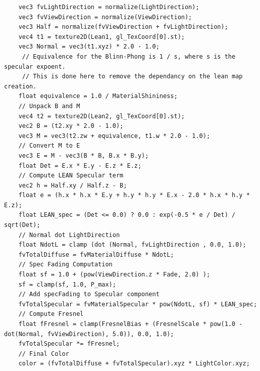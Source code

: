 \documentclass[10pt, conference]{IEEEtran}
\begin{document}
\lstset{basicstyle=\footnotesize,xleftmargin=20pt,numbers=left, breaklines=true, language=C, caption=GLSL pseudo code for specular fading applied in LEAN shader in tangent space., label=GLSLCode}
\begin{lstlisting}
	vec3 fvLightDirection = normalize(LightDirection);
	vec3 fvViewDirection = normalize(ViewDirection);
	vec3 Half = normalize(fvViewDirection + fvLightDirection);
	vec4 t1 = texture2D(Lean1, gl_TexCoord[0].st);
	vec3 Normal = vec3(t1.xyz) * 2.0 - 1.0;
	 // Equivalence for the Blinn-Phong is 1 / s, where s is the specular expoent.
	 // This is done here to remove the dependancy on the lean map creation.
	float equivalence = 1.0 / MaterialShininess;
	// Unpack B and M
	vec4 t2 = texture2D(Lean2, gl_TexCoord[0].st);
	vec2 B = (t2.xy * 2.0 - 1.0);
	vec3 M = vec3(t2.zw + equivalence, t1.w * 2.0 - 1.0);
	// Convert M to E
	vec3 E = M - vec3(B * B, B.x * B.y);
	float Det = E.x * E.y - E.z * E.z;
	// Compute LEAN Specular term
	vec2 h = Half.xy / Half.z - B;
	float e = (h.x * h.x * E.y + h.y * h.y * E.x - 2.0 * h.x * h.y * E.z);
	float LEAN_spec = (Det <= 0.0) ? 0.0 : exp(-0.5 * e / Det) / sqrt(Det);
	// Normal dot LightDirection
	float NdotL = clamp (dot (Normal, fvLightDirection , 0.0, 1.0);
	fvTotalDiffuse = fvMaterialDiffuse * NdotL;
	// Spec Fading Computation
	float sf = 1.0 + (pow(ViewDirection.z * Fade, 2.0) );
	sf = clamp(sf, 1.0, P_max);
	// Add specFading to Specular component
	fvTotalSpecular = fvMaterialSpecular * pow(NdotL, sf) * LEAN_spec;
	// Compute Fresnel
	float fFresnel = clamp(FresnelBias + (FresnelScale * pow(1.0 - dot(Normal, fvViewDirection), 5.0)), 0.0, 1.0);
	fvTotalSpecular *= fFresnel;
	// Final Color
	color = (fvTotalDiffuse + fvTotalSpecular).xyz * LightColor.xyz;
\end{lstlisting}
\end{document}
